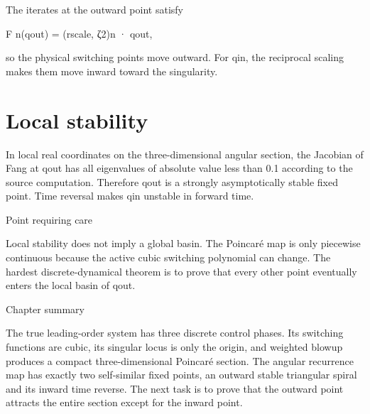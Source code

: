 The iterates at the outward point satisfy


\begin{displaytext}
F n(qout) = (rscale, ζ2)n · qout,
\end{displaytext}

so the physical switching points move outward. For qin, the reciprocal scaling makes them move inward toward the singularity.


\section{Local stability}

In local real coordinates on the three-dimensional angular section, the Jacobian of Fang at qout has all eigenvalues of absolute value less than 0.1 according to the source computation. Therefore qout is a strongly asymptotically stable fixed point. Time reversal makes qin unstable in forward time.


\begin{insightbox}{Point requiring care}
\end{insightbox}

Local stability does not imply a global basin. The Poincaré map is only piecewise continuous because the active cubic switching polynomial can change. The hardest discrete-dynamical theorem is to prove that every other point eventually enters the local basin of qout.


\begin{insightbox}{Chapter summary}
\end{insightbox}

The true leading-order system has three discrete control phases. Its switching functions are cubic, its singular locus is only the origin, and weighted blowup produces a compact three-dimensional Poincaré section. The angular recurrence map has exactly two self-similar fixed points, an outward stable triangular spiral and its inward time reverse. The next task is to prove that the outward point attracts the entire section except for the inward point.

